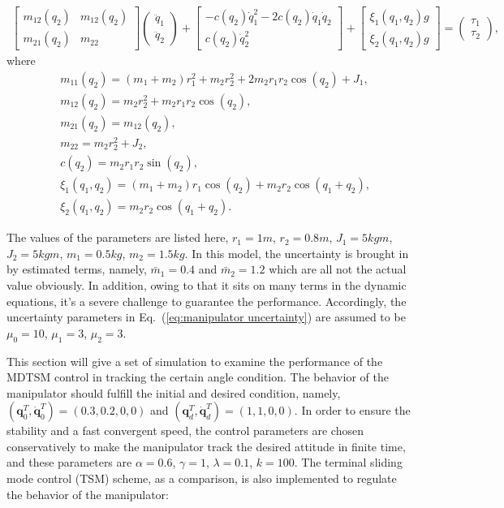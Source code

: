 \documentclass[3p]{elsarticle}
\theoremstyle{plain}
\theoremstyle{remark}
\begin{document}
\begin{align}
\begin{bmatrix}
m_{12}(q_2) &m_{12}(q_2)\\
m_{21}(q_2) &m_{22}
\end{bmatrix}
\begin{pmatrix}
\ddot q_1\\
\ddot q_2
\end{pmatrix}
+
\begin{bmatrix}
-c(q_2)\dot q_1^2-2c(q_2)\dot q_1\dot q_2\\
c(q_2)\dot q_2^2
\end{bmatrix}+
\begin{bmatrix}
\xi_1(q_1,q_2) g\\
\xi_2(q_1,q_2) g
\end{bmatrix}=
\begin{pmatrix}
\tau_1\\
\tau_2
\end{pmatrix},
\end{align}
where
\begin{align*}
&m_{11}(q_2)=(m_1+m_2)r_1^2+m_2r_2^2+2m_2r_1r_2\cos(q_2)+J_1,\\
&m_{12}(q_2)=m_2r_2^2+m_2r_1r_2\cos(q_2),\\
&m_{21}(q_2)=m_{12}(q_2),\\
&m_{22}=m_2r_2^2+J_2,\\
&c(q_2)=m_2r_1r_2\sin(q_2),\\
&\xi_1(q_1,q_2) =(m_1+m_2)r_1\cos(q_2)+m_2r_2\cos(q_1+q_2),\\
&\xi_2(q_1,q_2) = m_2r_2\cos(q_1+q_2).
\end{align*}\par
The values of the parameters are listed here, $r_1=1m$, $r_2=0.8m$, $J_1=5 kgm$, $J_2=5kgm$, $m_1=0.5kg$, $m_2=1.5kg$. In this model, the uncertainty is brought in by estimated terms, namely, $\bar m_1=0.4$ and $\bar m_2=1.2$ which are all not the actual value obviously. In addition, owing to that it sits on many terms in the dynamic equations, it's a severe challenge to guarantee the performance. Accordingly, the uncertainty parameters in Eq.~(\ref{eq:manipulator uncertainty}) are assumed to be $\mu_0=10$, $\mu_1=3$, $\mu_2=3$.\par
This section will give a set of simulation to examine the performance of the MDTSM control in tracking the certain angle condition. The behavior of the manipulator should fulfill the initial and desired condition, namely, $(\bm q_0^T, \dot{\bm q}_0^T)= (0.3,0.2,0,0)$ and $({\bm q}_d^T,\dot{\bm q}_d^T)=(1,1,0,0)$. In order to ensure the stability and a fast convergent speed, the control parameters are chosen conservatively to make the manipulator track the desired attitude in finite time, and these parameters are $\alpha = 0.6$, $\gamma = 1$, $\lambda = 0.1$, $k = 100$. The terminal sliding mode control (TSM) scheme, as a comparison, is also implemented to regulate the behavior of the manipulator:
\end{document}
